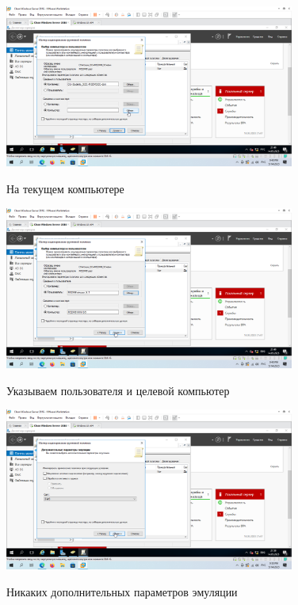 \documentclass[a4paper]{article}
\begin{document}
  \begin{figure}[H]
    \centering
    \includegraphics[width=0.85\textwidth]{5_0122}
    \label{img:122}
    \caption{На текущем компьютере}
  \end{figure}

  \begin{figure}[H]
    \centering
    \includegraphics[width=0.85\textwidth]{5_0123}
    \label{img:123}
    \caption{Указываем пользователя и целевой компьютер}
  \end{figure}

  \begin{figure}[H]
    \centering
    \includegraphics[width=0.85\textwidth]{5_0125}
    \label{img:125}
    \caption{Никаких дополнительных параметров эмуляции}
  \end{figure}
\end{document}
